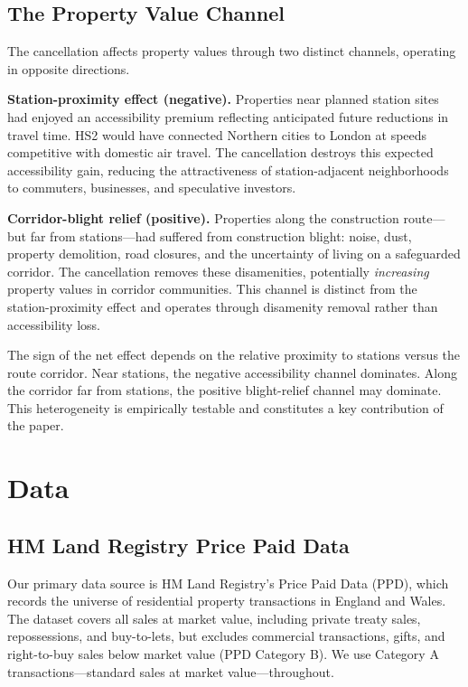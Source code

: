 \documentclass[12pt]{article}
\begin{document}
\subsection{The Property Value Channel}

The cancellation affects property values through two distinct channels, operating in opposite directions.

\textbf{Station-proximity effect (negative).} Properties near planned station sites had enjoyed an accessibility premium reflecting anticipated future reductions in travel time. HS2 would have connected Northern cities to London at speeds competitive with domestic air travel. The cancellation destroys this expected accessibility gain, reducing the attractiveness of station-adjacent neighborhoods to commuters, businesses, and speculative investors.

\textbf{Corridor-blight relief (positive).} Properties along the construction route---but far from stations---had suffered from construction blight: noise, dust, property demolition, road closures, and the uncertainty of living on a safeguarded corridor. The cancellation removes these disamenities, potentially \textit{increasing} property values in corridor communities. This channel is distinct from the station-proximity effect and operates through disamenity removal rather than accessibility loss.

The sign of the net effect depends on the relative proximity to stations versus the route corridor. Near stations, the negative accessibility channel dominates. Along the corridor far from stations, the positive blight-relief channel may dominate. This heterogeneity is empirically testable and constitutes a key contribution of the paper.


\section{Data}

\subsection{HM Land Registry Price Paid Data}

Our primary data source is HM Land Registry's Price Paid Data (PPD), which records the universe of residential property transactions in England and Wales. The dataset covers all sales at market value, including private treaty sales, repossessions, and buy-to-lets, but excludes commercial transactions, gifts, and right-to-buy sales below market value (PPD Category B). We use Category A transactions---standard sales at market value---throughout.
\end{document}
